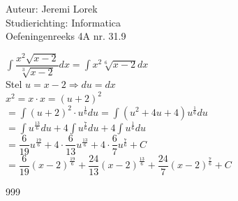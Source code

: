 \documentclass[a4paper]{article}
\begin{document}
\noindent \large Auteur: Jeremi Lorek\\
\noindent \large Studierichting: Informatica\\
\noindent \large Oefeningenreeks 4A nr. 31.9\\

\medskip
\normalsize

$\displaystyle \int \dfrac{x^2 \sqrt{x - 2}}{\sqrt[3]{x - 2}}  dx = \int x^2 \sqrt[6]{x - 2}  dx$ \\

Stel $u = x - 2 \Rightarrow du = dx$\\

$x^2 = x \cdot x = (u + 2)^2$ \\

$= \displaystyle \int (u + 2)^2 \cdot u^{\tfrac{1}{6}}  du = \int (u^2 + 4u + 4) u^{\tfrac{1}{6}}  du$ \\

$= \displaystyle \int u^{\tfrac{13}{6}}  du + 4 \int u^{\tfrac{7}{6}}  du + 4 \int u^{\tfrac{1}{6}}  du$ \\

$= \dfrac{6}{19} u^{\tfrac{19}{6}} + 4 \cdot \dfrac{6}{13} u^{\tfrac{13}{6}} + 4 \cdot \dfrac{6}{7} u^{\tfrac{7}{6}} + C$ \\

$= \dfrac{6}{19} (x - 2)^{\tfrac{19}{6}} + \dfrac{24}{13} (x - 2)^{\tfrac{13}{6}} + \dfrac{24}{7} (x - 2)^{\tfrac{7}{6}} + C$ \\

\begin{thebibliography}{999}
\end{thebibliography}
\end{document}
